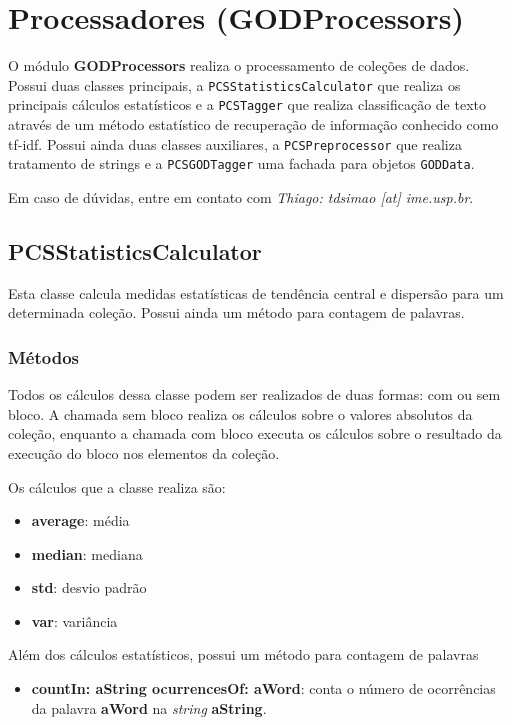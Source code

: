 

\section{Processadores (GODProcessors)}

O módulo \textbf{GODProcessors} realiza o processamento de coleções de dados.
Possui duas classes principais, a \texttt{PCSStatisticsCalculator} que realiza os principais
cálculos estatísticos e a \texttt{PCSTagger} que realiza classificação de texto através de
um método estatístico de recuperação de informação conhecido como tf-idf. Possui ainda duas classes auxiliares, a 
\texttt{PCSPreprocessor} que realiza tratamento de strings e a \texttt{PCSGODTagger} uma fachada
para objetos \texttt{GODData}.

Em caso de dúvidas, entre em contato com \emph{Thiago: tdsimao [at] ime.usp.br}.


\subsection{PCSStatisticsCalculator} 

Esta classe calcula medidas estatísticas de tendência central e dispersão para um determinada
coleção. Possui ainda um método para contagem de palavras.


\subsubsection{Métodos}
Todos os cálculos dessa classe podem ser realizados de duas formas: com ou sem bloco. A chamada
sem bloco realiza os cálculos sobre o valores absolutos da coleção, enquanto a chamada com
bloco executa os cálculos sobre o resultado da execução do bloco nos elementos da coleção.

Os cálculos que a classe realiza são:
\begin{itemize}
    \item \textbf{average}: média 
    \item \textbf{median}: mediana
    \item \textbf{std}: desvio padrão
    \item \textbf{var}: variância
\end{itemize}

Além dos cálculos estatísticos, possui um método para contagem de palavras
\begin{itemize}
    \item \textbf{countIn: aString ocurrencesOf: aWord}: conta o número de ocorrências da palavra
                   \textbf{aWord} na \textit{string} \textbf{aString}.
\end{itemize}

